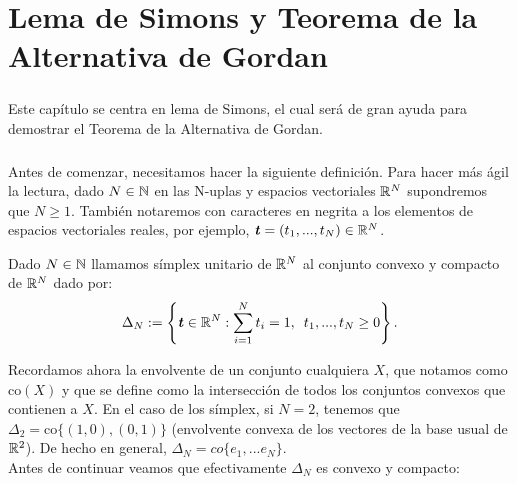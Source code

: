 \chapter{Lema de Simons y Teorema de la Alternativa de Gordan}
	\thispagestyle{empty}
	\newcommand{\ttt}{\textbf{\emph{t}}}
	\newcommand{\sss}{\textbf{\emph{s}}}
	\newcommand{\xx}{\textbf{\emph{x}}}
	\newcommand{\yy}{\textbf{\emph{y}}}
	
	\paragraph{}Este capítulo se centra en lema de Simons, el cual será de gran ayuda para demostrar el Teorema de la Alternativa de Gordan.

	\paragraph{}Antes de comenzar, necesitamos hacer la siguiente definición. Para hacer más ágil la lectura, dado $ N\in \mathbb{N} $ en las N-uplas y espacios vectoriales $ \mathbb{R}^N $ supondremos que $ N \geq 1 $. También notaremos con caracteres en negrita a los elementos de espacios vectoriales reales, por ejemplo, $  \ttt = (t_1,...,t_N)\in \RR^N$. 
	
	\begin{definicion}
		Dado $ N \in \mathbb{N} $ llamamos símplex unitario de $ \mathbb{R}^N $ al conjunto convexo y compacto de $ \mathbb{R}^N $ dado por:
		\begin{equation*}
			\Delta_N := \left\lbrace \ttt \in \RR^N: \sum_{i=1}^{N}{t_i} = 1, \hspace{0.5em} t_1,...,t_N \geq 0 \right\rbrace .
		\end{equation*}
	\end{definicion}

	Recordamos ahora la envolvente de un conjunto cualquiera $ X $, que notamos como $ \mathrm{co}(X) $ y que se define como la intersección de todos los conjuntos convexos que contienen a $ X $. En el caso de los símplex, si $ N = 2 $, tenemos que $ \Delta_2 = \mathrm{co} \{(1,0),(0,1)\}$ (envolvente convexa de los vectores de la base usual de $ \mathbb{R}^2 $). De hecho en general, $ \Delta_N = co\{e_1,...e_N\} $. \\
	
	Antes de continuar veamos que efectivamente $ \Delta_N $ es convexo y compacto:
	
